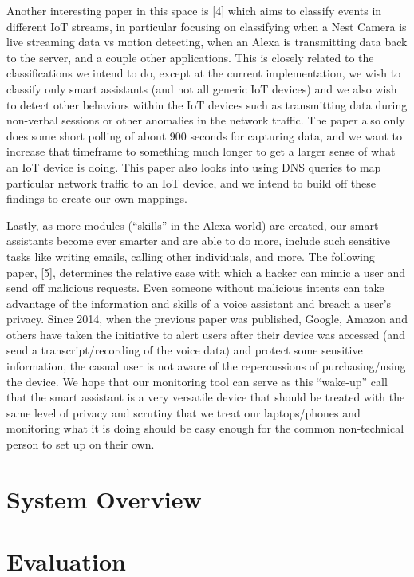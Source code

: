 \documentclass[sigconf]{acmart}
\begin{document}
Another interesting paper in this space is [4] which aims to classify events in different IoT streams, in particular focusing on classifying when a Nest Camera is live streaming data vs motion detecting, when an Alexa is transmitting data back to the server, and a couple other applications. This is closely related to the classifications we intend to do, except at the current implementation, we wish to classify only smart assistants (and not all generic IoT devices) and we also wish to detect other behaviors within the IoT devices such as transmitting data during non-verbal sessions or other anomalies in the network traffic. The paper also only does some short polling of about 900 seconds for capturing data, and we want to increase that timeframe to something much longer to get a larger sense of what an IoT device is doing. This paper also looks into using DNS queries to map particular network traffic to an IoT device, and we intend to build off these findings to create our own mappings.

Lastly, as more modules (“skills” in the Alexa world) are created, our smart assistants become ever smarter and are able to do more, include such sensitive tasks like writing emails, calling other individuals, and more. The following paper, [5], determines the relative ease with which a hacker can mimic a user and send off malicious requests. Even someone without malicious intents can take advantage of the information and skills of a voice assistant and breach a user’s privacy. Since 2014, when the previous paper was published, Google, Amazon and others have taken the initiative to alert users after their device was accessed (and send a transcript/recording of the voice data) and protect some sensitive information, the casual user is not aware of the repercussions of purchasing/using the device. We hope that our monitoring tool can serve as this “wake-up” call that the smart assistant is a very versatile device that should be treated with the same level of privacy and scrutiny that we treat our laptops/phones and monitoring what it is doing should be easy enough for the common non-technical person to set up on their own.


\section{System Overview}

\section{Evaluation}
\end{document}
